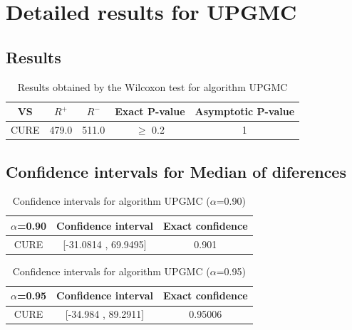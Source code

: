 \documentclass[a4paper,10pt]{article}
\begin{document}
 \clearpage 


\section{Detailed results for UPGMC}


\subsection{Results}

\begin{table}[!htp]
\centering\small
\begin{tabular}{
|c|c|c|c|c|}
\hline
 VS & $R^{+}$ & $R^{-}$ & Exact P-value & Asymptotic P-value \\ \hline 
CURE & 479.0 & 511.0 & $\geq$ 0.2 & 1\\ \hline 

\end{tabular}
\caption{Results obtained by the Wilcoxon test for algorithm UPGMC}
\end{table}

\subsection{Confidence intervals for Median of diferences}

\begin{table}[!htp]
\centering\small
\begin{tabular}{
|c|c|c|}
\hline
 $\alpha$=0.90 & Confidence interval & Exact confidence \\ \hline 
CURE & [-31.0814 , 69.9495] & 0.901\\ \hline 

\end{tabular}
\caption{Confidence intervals for algorithm UPGMC ($\alpha$=0.90)}
\end{table}
\begin{table}[!htp]
\centering\small
\begin{tabular}{
|c|c|c|}
\hline
 $\alpha$=0.95 & Confidence interval & Exact confidence \\ \hline 
CURE & [-34.984 , 89.2911] & 0.95006\\ \hline 

\end{tabular}
\caption{Confidence intervals for algorithm UPGMC ($\alpha$=0.95)}
\end{table}

 \clearpage 
\end{document}

